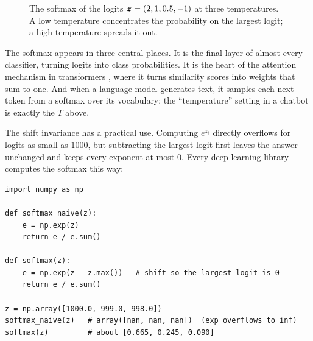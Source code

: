 \begin{figure}[ht]
  \centering
  \caption{The softmax of the logits $\bm{z} = (2, 1, 0.5, -1)$ at three
    temperatures. A low temperature concentrates the probability on the
    largest logit; a high temperature spreads it out.}
  \label{fig:ch01-softmax}
\end{figure}

\begin{aibox}
  The softmax appears in three central places. It is the final layer of
  almost every classifier, turning logits into class probabilities. It is
  the heart of the attention mechanism in transformers
  \cite{vaswani2017attention}, where it turns similarity scores into
  weights that sum to one. And when a language model generates text, it samples each
  next token from a softmax over its vocabulary; the ``temperature''
  setting in a chatbot is exactly the $T$ above.
\end{aibox}

The shift invariance has a practical use. Computing $e^{z_i}$ directly
overflows for logits as small as $1000$, but subtracting the largest logit
first leaves the answer unchanged and keeps every exponent at most $0$.
Every deep learning library computes the softmax this way:

\begin{lstlisting}
import numpy as np

def softmax_naive(z):
    e = np.exp(z)
    return e / e.sum()

def softmax(z):
    e = np.exp(z - z.max())   # shift so the largest logit is 0
    return e / e.sum()

z = np.array([1000.0, 999.0, 998.0])
softmax_naive(z)   # array([nan, nan, nan])  (exp overflows to inf)
softmax(z)         # about [0.665, 0.245, 0.090]
\end{lstlisting}


